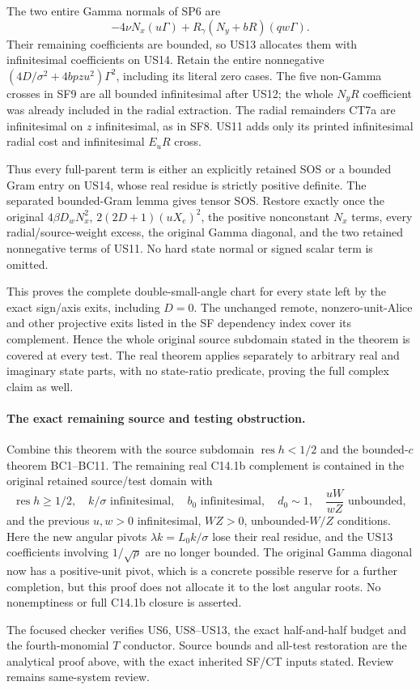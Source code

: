 The two entire Gamma normals of SP6 are
\[
       -4\nu N_x(u\Gamma)
            +R_\gamma(N_y+bR)(qw\Gamma).
\]
Their remaining coefficients are bounded, so US13 allocates them
with infinitesimal coefficients on US14. Retain the entire
nonnegative $(4D/\sigma^2+4bpzu^2)\Gamma^2$, including its literal
zero cases. The five non-Gamma crosses in SF9 are all bounded
infinitesimal after US12; the whole $N_yR$ coefficient was already
included in the radial extraction. The radial remainders CT7a are
infinitesimal on $z$ infinitesimal, as in SF8. US11 adds only its
printed infinitesimal radial cost and infinitesimal $E_uR$ cross.

Thus every full-parent term is either an explicitly retained SOS
or a bounded Gram entry on US14, whose real residue is strictly
positive definite. The separated bounded-Gram lemma gives tensor
SOS. Restore exactly once the original $4\beta D_wN_x^2$,
$2(2D+1)(uX_e)^2$, the positive nonconstant $N_x$ terms, every
radial/source-weight excess, the original Gamma diagonal, and the
two retained nonnegative terms of US11. No hard state normal or
signed scalar term is omitted.

This proves the complete double-small-angle chart for every state
left by the exact sign/axis exits, including $D=0$. The unchanged
remote, nonzero-unit-Alice and other projective exits listed in the
SF dependency index cover its complement. Hence the whole original
source subdomain stated in the theorem is covered at every test.
The real theorem applies separately to arbitrary real and imaginary
state parts, with no state-ratio predicate, proving the full complex
claim as well.

\paragraph{The exact remaining source and testing obstruction.}
Combine this theorem with the source subdomain
$\operatorname{res}h<1/2$ and the bounded-$c$ theorem BC1--BC11.
The remaining real C14.1b complement is contained in the original
retained source/test domain with
\[
 \operatorname{res}h\ge1/2,\quad k/\sigma\text{ infinitesimal},
 \quad b_0\text{ infinitesimal},\quad d_0\sim1,
 \quad \frac{uW}{wZ}\text{ unbounded},
 \tag{US15}
\]
and the previous $u,w>0$ infinitesimal, $WZ>0$, unbounded-$W/Z$
conditions. Here the new angular pivots $\lambda k=L_0k/\sigma$
lose their real residue, and the US13 coefficients involving
$1/\sqrt\rho$ are no longer bounded. The original Gamma diagonal
now has a positive-unit pivot, which is a concrete possible reserve
for a further completion, but this proof does not allocate it to
the lost angular roots. No nonemptiness or full C14.1b closure is
asserted.

The focused checker verifies US6, US8--US13, the exact half-and-half
budget and the fourth-monomial $T$ conductor. Source bounds and
all-test restoration are the analytical proof above, with the exact
inherited SF/CT inputs stated. Review remains same-system review.
